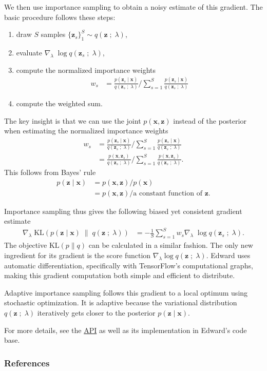 We then use importance sampling to obtain a noisy estimate of this gradient.
The basic procedure follows these steps:
\begin{enumerate}
  \item draw $S$ samples $\{\mathbf{z}_s\}_1^S \sim q(\mathbf{z}\;;\;\lambda)$,
  \item evaluate $\nabla_\lambda\; \log q(\mathbf{z}_s\;;\;\lambda)$,
  \item compute the normalized importance weights
  \begin{align*}
    w_s
    &=
    \frac{p(\mathbf{z}_s \mid \mathbf{x})}{q(\mathbf{z}_s\;;\;\lambda)}
    \Bigg/
    \sum_{s=1}^{S}
    \frac{p(\mathbf{z}_s \mid \mathbf{x})}{q(\mathbf{z}_s\;;\;\lambda)}
  \end{align*}
  \item compute the weighted sum.
\end{enumerate}
The key insight is that we can use the joint $p(\mathbf{x},\mathbf{z})$ instead of the posterior
when estimating the normalized importance weights
\begin{align*}
  w_s
  &=
  \frac{p(\mathbf{z}_s \mid \mathbf{x})}{q(\mathbf{z}_s\;;\;\lambda)}
  \Bigg/
  \sum_{s=1}^{S}
  \frac{p(\mathbf{z}_s \mid \mathbf{x})}{q(\mathbf{z}_s\;;\;\lambda)} \\
  &=
  \frac{p(\mathbf{x}, \mathbf{z}_s)}{q(\mathbf{z}_s\;;\;\lambda)}
  \Bigg/
  \sum_{s=1}^{S}
  \frac{p(\mathbf{x}, \mathbf{z}_s)}{q(\mathbf{z}_s\;;\;\lambda)}.
\end{align*}
This follows from Bayes' rule
\begin{align*}
  p(\mathbf{z} \mid \mathbf{x})
  &=
  p(\mathbf{x}, \mathbf{z}) / p(\mathbf{x})\\
  &=
  p(\mathbf{x}, \mathbf{z}) / \text{a constant function of }\mathbf{z}.
\end{align*}

Importance sampling thus gives the following biased yet consistent gradient
estimate
\begin{align*}
\nabla_\lambda\;
  \text{KL}(
  p(\mathbf{z} \mid \mathbf{x})
  \;\|\;
  q(\mathbf{z}\;;\;\lambda)
  )
  &=
  -
  \frac{1}{S}
  \sum_{s=1}^S
  w_s
  \nabla_\lambda\; \log q(\mathbf{z}_s\;;\;\lambda).
\end{align*}
The objective $\text{KL}(p\|q)$ can be calculated in a similar fashion.
The only new ingredient for its gradient is the score function
$\nabla_\lambda \log q(\mathbf{z}\;;\;\lambda)$.  Edward uses automatic
differentiation, specifically with TensorFlow's computational graphs,
making this gradient computation both simple and efficient to
distribute.

Adaptive importance sampling follows this gradient to a local optimum using
stochastic optimization. It is adaptive because the variational distribution
$q(\mathbf{z}\;;\;\lambda)$ iteratively gets closer to the posterior $p(\mathbf{z} \mid \mathbf{x})$.

For more details, see the \href{/api/}{API} as well as its
implementation in Edward's code base.

\subsubsection{References}\label{references}
